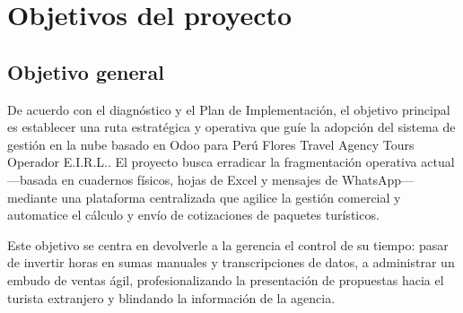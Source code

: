 \section{Objetivos del proyecto}

\subsection{Objetivo general}
\begin{indentedsubsection}
De acuerdo con el diagnóstico y el Plan de Implementación, el objetivo principal es establecer una ruta estratégica y operativa que guíe la adopción del sistema de gestión en la nube basado en Odoo para Perú Flores Travel Agency Tours Operador E.I.R.L.. El proyecto busca erradicar la fragmentación operativa actual ---basada en cuadernos físicos, hojas de Excel y mensajes de WhatsApp--- mediante una plataforma centralizada que agilice la gestión comercial y automatice el cálculo y envío de cotizaciones de paquetes turísticos.

Este objetivo se centra en devolverle a la gerencia el control de su tiempo: pasar de invertir horas en sumas manuales y transcripciones de datos, a administrar un embudo de ventas ágil, profesionalizando la presentación de propuestas hacia el turista extranjero y blindando la información de la agencia.
\end{indentedsubsection}

